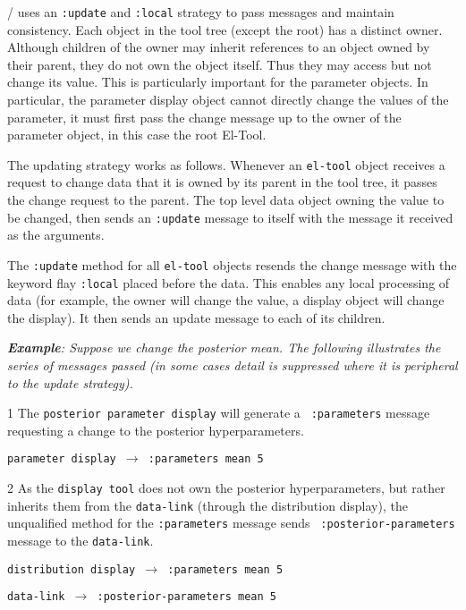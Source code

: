 \eltoy/ uses an {\tt :update\/} and {\tt :local\/} strategy to pass
messages and maintain consistency.  Each object in the tool tree
(except the root) has a distinct owner.  Although children of the
owner may inherit references to an object owned by their parent, they
do not own the object itself.  Thus they may access but not change its
value.  This is particularly important for the parameter objects.  In
particular, the parameter display object cannot directly change the
values of the parameter, it must first pass the change message up to
the owner of the parameter object, in this case the root El-Tool.

The updating strategy works as follows.  Whenever an {\tt el-tool\/} object
receives a request to change data that it is owned by its parent in
the tool tree, it passes the change request to the parent.  The top
level data object owning the value to be changed, then sends an
{\tt :update\/} message to itself with the message it received as the
arguments.

The {\tt :update\/} method for all {\tt el-tool\/} objects resends the change
message with the keyword flay {\tt :local\/} placed before the data.
This enables any local processing of data (for example, the owner will
change the value, a display object will change the display).  
It then sends an update message to each of its children.

\begingroup\narrower\sl
{\bf Example\/}: Suppose we change the posterior mean.  The following
illustrates the series of messages passed (in some cases detail is
suppressed where it is peripheral to the update strategy).

\item{1} The {\tt posterior parameter display\/} will generate a {\tt
:parameters\/}  message requesting a change to the posterior
hyperparameters.  

{\tt parameter display $\rightarrow$ :parameters mean 5}


\item{2} As the  {\tt display tool\/} does not own the posterior
hyperparameters, but rather inherits them from the {\tt data-link\/}
(through the distribution display), the unqualified
method for the {\tt :parameters\/} message sends {\tt
:posterior-parameters\/} message to the {\tt data-link\/}.  

{\tt distribution display $\rightarrow$ :parameters mean 5}\par
{\tt data-link $\rightarrow$ :posterior-parameters mean 5}\par

